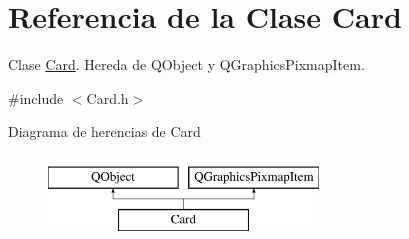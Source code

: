 \hypertarget{classCard}{\section{Referencia de la Clase Card}
\label{classCard}
}


Clase \hyperlink{classCard}{Card}. Hereda de Q\-Object y Q\-Graphics\-Pixmap\-Item.  




{\ttfamily \#include $<$Card.\-h$>$}

Diagrama de herencias de Card\begin{figure}[H]
\begin{center}
\leavevmode
\includegraphics[height=2.000000cm]{classCard}
\end{center}
\end{figure}
